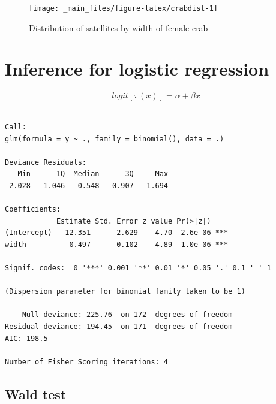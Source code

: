 \documentclass[]{book}
\newenvironment{Shaded}{\begin{snugshade}}{\end{snugshade}}
\newcommand{\DataTypeTok}[1]{\textcolor[rgb]{0.13,0.29,0.53}{#1}}
\newcommand{\KeywordTok}[1]{\textcolor[rgb]{0.13,0.29,0.53}{\textbf{#1}}}
\newcommand{\NormalTok}[1]{#1}
\newcommand{\OperatorTok}[1]{\textcolor[rgb]{0.81,0.36,0.00}{\textbf{#1}}}
\newcommand{\StringTok}[1]{\textcolor[rgb]{0.31,0.60,0.02}{#1}}
\begin{document}
\begin{figure}[H]

{\centering \texttt{[image: \_main\_files/figure-latex/crabdist-1]} 

}

\caption{Distribution of satellites by width of female crab\label{crabdist}}\label{fig:crabdist}
\end{figure}

\hypertarget{inference-for-logistic-regression}{%
\section{Inference for logistic regression}\label{inference-for-logistic-regression}}

\[logit[\pi(x)] = \alpha + \beta x\]

\begin{Shaded}
\end{Shaded}

\begin{verbatim}

Call:
glm(formula = y ~ ., family = binomial(), data = .)

Deviance Residuals: 
   Min      1Q  Median      3Q     Max  
-2.028  -1.046   0.548   0.907   1.694  

Coefficients:
            Estimate Std. Error z value Pr(>|z|)    
(Intercept)  -12.351      2.629   -4.70  2.6e-06 ***
width          0.497      0.102    4.89  1.0e-06 ***
---
Signif. codes:  0 '***' 0.001 '**' 0.01 '*' 0.05 '.' 0.1 ' ' 1

(Dispersion parameter for binomial family taken to be 1)

    Null deviance: 225.76  on 172  degrees of freedom
Residual deviance: 194.45  on 171  degrees of freedom
AIC: 198.5

Number of Fisher Scoring iterations: 4
\end{verbatim}

\hypertarget{wald-test}{%
\subsection{Wald test}\label{wald-test}}
\end{document}
